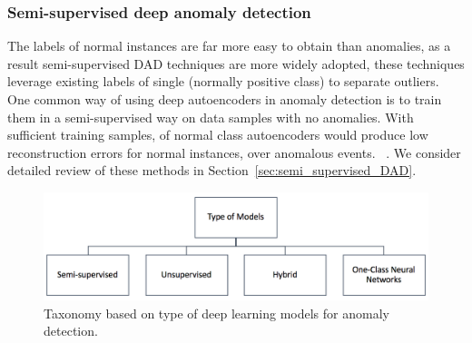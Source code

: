 \begin{table}
\centering
{}
\caption{Table illustrating nature of input data and corresponding deep anomaly detection model architectures proposed in literature.
        \\CNN: Convolution Neural Networks, LSTM : Long Short Term Memory Networks \\
         AE: Autoencoders. }
\label{tab:dataTypeModelArchitecture}
\end{table}
\subsubsection{Semi-supervised deep anomaly detection}
\label{semi_supervised_learning}
The labels of normal instances are far more easy to obtain than anomalies, as a result semi-supervised DAD techniques are more widely adopted, these techniques leverage existing labels of single (normally positive class) to separate outliers. One common way of using deep autoencoders  in anomaly detection is to train them in a semi-supervised way on data samples with no anomalies. With sufficient training samples, of normal class autoencoders would produce low reconstruction errors for normal instances, over anomalous events.
~\cite{wulsin2010semi,nadeem2016semi,song2017hybrid}. We consider detailed review of these methods in  Section~\ref{sec:semi_supervised_DAD}.

\begin{figure}[h]
\centering
\includegraphics[scale=0.7]{images/TypeOfModels}
\captionsetup{justification=centering}
\caption{Taxonomy based on type of deep learning models for anomaly detection.}
\label{fig:typeOfModels}
\end{figure}

